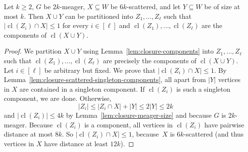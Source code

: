 \documentclass[]{lmcs}
\newcommand{\feetb}{W}
\newcommand{\footbset}{X}
\newcommand{\footbsetA}{X}
\newcommand{\footbsetB}{Y}
\newcommand{\footbsetC}{Z}
\newcommand{\closure}[1]{\operatorname{cl}(#1)}
\begin{document}
\begin{lem}
	\label{lem:closure-distance}
	Let $k \geq 2$,
	$G$ be $2k$-meager,
	$\footbsetA \subseteq \feetb$ be $6k$-scattered,
	and let $\footbsetB \subseteq \feetb$ be of size at most $k$.
	Then $\footbsetA \cup \footbsetB$ can be partitioned
	into $\footbsetC_1, \dots, \footbsetC_\ell$
	such that $|\closure{\footbsetC_i} \cap \footbsetA| \leq 1$ for every $i\in [\ell]$
	and	$\closure{\footbsetC_1}, \dots, \closure{\footbsetC_\ell}$
	are the components of $\closure{\footbsetA \cup \footbsetB}$.
\end{lem}

\begin{proof}
	We partition $\footbsetA \cup \footbsetB$ using Lemma~\ref{lem:closure-components}
	into $\footbsetC_1, \dots, \footbsetC_\ell$
	such that $\closure{\footbsetC_1}, \dots, \closure{\footbsetC_\ell}$
	are precisely the components of $\closure{\footbsetA \cup \footbsetB}$.	
	Let $i \in [\ell]$ be arbitrary but fixed. We prove that $|\closure{\footbsetC_i} \cap \footbsetA| \leq 1$.
	By Lemma~\ref{lem:closure-scattered-singleton-components},
	all apart from $|\footbsetB|$ vertices in $\footbsetA$ are contained
	in a singleton component.
	If $\closure{\footbsetC_i}$ is such a singleton component, we are done.
	Otherwise, \[|\footbsetC_i| \leq |\footbsetC_i \cap \footbsetA| + |\footbsetB| \leq 2|\footbsetB| \leq 2k\]
	and $|\closure{\footbsetC_i}| \leq 4k$ by Lemma~\ref{lem:closure-meager-size}
	and because $G$ is $2k$-meager.
	Because $\closure{\footbsetC_i}$ is a component,
	all vertices in $\closure{\footbsetC_i}$ have pairwise distance at most $8k$.
	So $|\closure{\footbsetC_i} \cap \footbsetA| \leq 1$,
	because~$\footbset$ is $6k$-scattered (and thus vertices in $\footbset$ have distance at least $12k$).
\end{proof}
\end{document}
